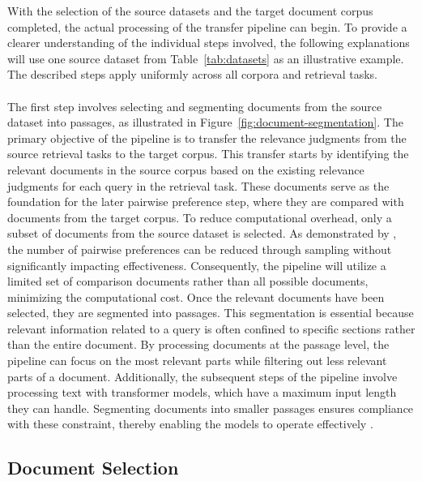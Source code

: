 With the selection of the source datasets and the target document corpus \mbox{completed}, the actual processing of the transfer pipeline can begin. To \mbox{provide} a clearer understanding of the individual steps involved, the following explanations will use one source dataset from Table~\ref{tab:datasets} as an illustrative example. The described steps apply uniformly across all corpora and retrieval tasks.
\\\\
The first step involves selecting and segmenting documents from the source dataset into passages, as illustrated in Figure~\ref{fig:document-segmentation}. The primary objective of the pipeline is to transfer the relevance judgments from the source retrieval tasks to the target corpus. This transfer starts by identifying the relevant documents in the source corpus based on the existing relevance judgments for each query in the retrieval task. These documents serve as the foundation for the later pairwise preference step, where they are compared with documents from the target corpus. To reduce computational overhead, only a subset of documents from the source dataset is selected. As demonstrated by \mbox{\citet{gienapp:2022}}, the number of pairwise preferences can be reduced through sampling without significantly impacting effectiveness. Consequently, the pipeline will utilize a limited set of comparison documents rather than all possible documents, minimizing the computational cost. Once the relevant documents have been selected, they are segmented into passages. This segmentation is essential because relevant information related to a query is often confined to specific sections rather than the entire document. By processing documents at the passage level, the pipeline can focus on the most relevant parts while filtering out less relevant parts of a document. Additionally, the subsequent steps of the pipeline involve processing text with transformer models, which have a maximum input length they can handle. Segmenting documents into smaller passages ensures compliance with these constraint, thereby enabling the models to operate effectively \citep{levy:2024}.

\subsection{Document Selection}\label{document-selection}

